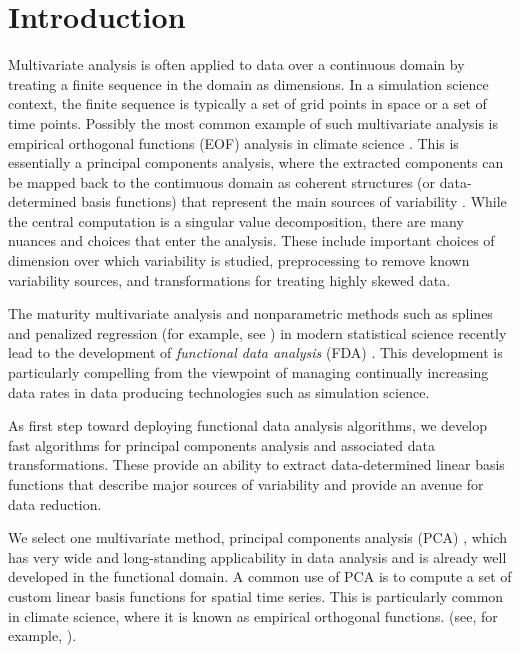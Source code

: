\section{Introduction}
\label{sec:intro}
Multivariate analysis is often applied to data over a continuous
domain by treating a finite sequence in the domain as dimensions. In a
simulation science context, the finite sequence is typically a set of
grid points in space or a set of time points. Possibly the most common
example of such multivariate analysis is empirical orthogonal
functions (EOF) analysis in climate science
\cite{Storch2001,Wackernagel2003,PutmanEtAl00Downscaling}. This is
essentially a principal components analysis, where the extracted
components can be mapped back to the contimuous domain as coherent
structures (or data-determined basis functions) that represent the
main sources of variability \cite{Jolliffe2002}. While the central
computation is a singular value decomposition, there are many nuances
and choices that enter the analysis. These include important choices
of dimension over which variability is studied, preprocessing to
remove known variability sources, and transformations for treating
highly skewed data.

The maturity multivariate analysis and nonparametric methods such as
splines and penalized regression (for example, see
\cite{Wasserman2006,Hastie2009}) in modern statistical science
recently lead to the development of {\em functional data analysis}
(FDA) \cite{Ramsey2005,Ferraty2006,Ramsey2009,Hsing2015}.  This
development is particularly compelling from the viewpoint of managing
continually increasing data rates in data producing technologies such
as simulation science.

As first step toward deploying functional data analysis algorithms, we
develop fast algorithms for principal components analysis and
associated data transformations. These provide an ability to extract
data-determined linear basis functions that describe major sources of
variability and provide an avenue for data reduction.

We select one multivariate method, principal components analysis
(PCA) \cite{Jolliffe2002}, which has very wide and long-standing
applicability in data analysis and is already well developed in the
functional domain. A common use of PCA is to compute a set of custom
linear basis functions for spatial time series. This is particularly
common in climate science, where it is known as empirical orthogonal
functions.  (see, for example, \cite{JOC2007}).

